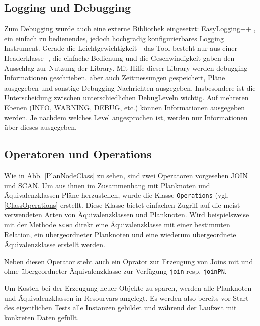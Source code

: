 \subsection{Logging und Debugging}
Zum Debugging wurde auch eine externe Bibliothek eingesetzt: EasyLogging++ \cite{easylogging}, ein einfach zu bedienendes, jedoch hochgradig konfigurierbares Logging Instrument. Gerade die Leichtgewichtigkeit - das Tool besteht nur aus einer Headerklasse -, die einfache Bedienung und die Geschwindigkeit gaben  den Ausschlag zur Nutzung der Library. Mit Hilfe dieser Library werden debugging Informationen geschrieben, aber auch Zeitmessungen gespeichert, Pläne ausgegeben und sonstige Debugging Nachrichten ausgegeben. Insbesondere ist die Unterscheidung zwischen unterschiedlichen Debug\-Leveln wichtig. Auf mehreren Ebenen (INFO, WARNING, DEBUG, etc.) können Informationen ausgegeben werden. Je nachdem welches Level angesprochen ist, werden nur Informationen über dieses ausgegeben. 

\subsection{Operatoren und Operations}
Wie in Abb. \ref{PlanNodeClass} zu sehen, sind zwei Operatoren vorgesehen JOIN und SCAN. Um aus ihnen im Zusammenhang mit Planknoten und Äquivalenzklassen Pläne herzustellen, wurde die Klasse \texttt{Operations} (vgl. \ref{ClassOperations} erstellt. Diese Klasse bietet einfachen Zugriff auf die meist verwendeten Arten von Äquivalenzklassen und Planknoten. Wird beispielsweise mit der Methode \texttt{scan} direkt eine Äquivalenzklasse mit einer bestimmten Relation, ein übergeordneter Planknoten und eine wiederum übergeordnete Äquivalenzklasse erstellt werden.

Neben diesen Operator steht auch ein Oprator zur Erzeugung von Joins mit und ohne übergeordneter Äquivalenzklasse zur Verfügung \texttt{join} resp. \texttt{joinPN}.

Um Kosten bei der Erzeugung neuer Objekte zu sparen, werden alle Planknoten und Äquivalenzklassen in Resourvars angelegt. Es werden also bereits vor Start des eigentlichen Tests alle Instanzen gebildet und während der Laufzeit mit konkreten Daten gefüllt.

